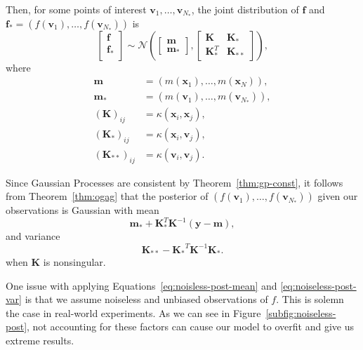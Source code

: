 Then, for some points of interest $\mathbf{v}_{1}, \dots, \mathbf{v}_{N_{*}}$, the joint distribution of $\mathbf{f}$ and $\mathbf{f}_* = (f(\mathbf{v}_1), \dots, f(\mathbf{v}_{N_*}))$ is
\begin{equation*}
    \begin{bmatrix}
        \mathbf{f} \\
        \mathbf{f}_{*} \\
    \end{bmatrix} \sim
    \mathcal{N}\left(
    \begin{bmatrix}
        \mathbf{m} \\ \mathbf{m}_{*}
    \end{bmatrix},
    \begin{bmatrix}
        \mathbf{K} & \mathbf{K}_* \\
        \mathbf{K}_*^T & \mathbf{K}_{* *}
    \end{bmatrix}\right),
\end{equation*}
where 
\begin{align*}
    \mathbf{m} &= (m(\mathbf{x}_1), \dots, m(\mathbf{x}_N)), \\
    \mathbf{m_*} &= (m(\mathbf{v}_1), \dots, m(\mathbf{v}_{N_{*}})), \\
    (\mathbf{K})_{ij} &= \kappa(\mathbf{x}_i, \mathbf{x}_j), \\
    (\mathbf{K}_*)_{ij} &= \kappa(\mathbf{x}_i, \mathbf{v}_j), \\
    (\mathbf{K}_{* *})_{ij} &= \kappa(\mathbf{v}_i, \mathbf{v}_j).
\end{align*}

Since Gaussian Processes are consistent by Theorem~\ref{thm:gp-const}, it follows from Theorem~\ref{thm:ogag} that the posterior
of $(f(\mathbf{v}_1), \dots, f(\mathbf{v}_{N_*}))$ given our observations is Gaussian with mean
\begin{equation} \label{eq:noisless-post-mean}
    \mathbf{m}_* + \mathbf{K}_*^T \mathbf{K}^{-1} (\mathbf{y} - \mathbf{m}), 
\end{equation}
and variance
\begin{equation} \label{eq:noiseless-post-var}
    \mathbf{K}_{* *} - \mathbf{K_*}^{T} \mathbf{K}^{-1} \mathbf{K_*}.
\end{equation}
when $\mathbf{K}$ is nonsingular.

One issue with applying Equations~\ref{eq:noisless-post-mean} and \ref{eq:noiseless-post-var} is that we assume noiseless and unbiased observations of $f$.
This is solemn the case in real-world experiments.
As we can see in Figure~\ref{subfig:noiseless-post}, not accounting for these factors can cause our model to overfit and give us extreme results.

